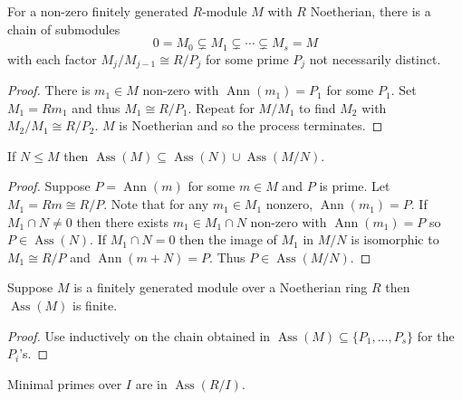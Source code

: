 \documentclass[a4paper]{article}
\DeclareMathOperator{\Ann}{Ann} %
\DeclareMathOperator{\Ass}{Ass} %
\begin{document}
\begin{lemma}
  \label{lem:chain of submodules related to associated primes}
  For a non-zero finitely generated \(R\)-module \(M\) with \(R\) Noetherian, there is a chain of submodules
  \[
    0 = M_0 \subsetneq M_1 \subsetneq \cdots \subsetneq M_s = M
  \]
  with each factor \(M_j/M_{j - 1} \cong R/P_j\) for some prime \(P_j\) not necessarily distinct.
\end{lemma}

\begin{proof}
  There is \(m_1 \in M\) non-zero with \(\Ann(m_1) = P_1\) for some \(P_1\). Set \(M_1 = Rm_1\) and thus \(M_1 \cong R/P_1\). Repeat for \(M/M_1\) to find \(M_2\) with \(M_2/M_1 \cong R/P_2\). \(M\) is Noetherian and so the process terminates.
\end{proof}

\begin{lemma}
  \label{lem:associated prime of sub and quotient}
  If \(N \leq M\) then \(\Ass(M) \subseteq \Ass(N) \cup \Ass(M/N)\).
\end{lemma}

\begin{proof}
  Suppose \(P = \Ann(m)\) for some \(m \in M\) and \(P\) is prime. Let \(M_1 = Rm \cong R/P\). Note that for any \(m_1 \in M_1\) nonzero, \(\Ann(m_1) = P\). If \(M_1 \cap N \neq 0\) then there exists \(m_1 \in M_1 \cap N\) non-zero with \(\Ann(m_1) = P\) so \(P \in \Ass(N)\). If \(M_1 \cap N = 0\) then the image of \(M_1\) in \(M/N\) is isomorphic to \(M_1 \cong R/P\) and \(\Ann(m + N) = P\). Thus \(P \in \Ass(M/N)\).
\end{proof}

\begin{lemma}
  Suppose \(M\) is a finitely generated module over a Noetherian ring \(R\) then \(\Ass(M)\) is finite.
\end{lemma}

\begin{proof}
  Use  inductively on the chain obtained in  \(\Ass(M) \subseteq \{P_1, \dots, P_s\}\) for the \(P_i\)'s.
\end{proof}

\begin{lemma}
  Minimal primes over \(I\) are in \(\Ass(R/I)\).
\end{lemma}
\end{document}
